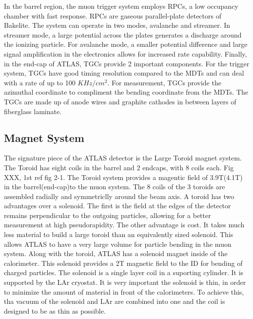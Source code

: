 \indent In the barrel region, the muon trigger system employs RPCs, a low occupancy chamber with fast response. RPCs are gaseous parallel-plate detectors of Bakelite. The system can operate in two modes, avalanche and streamer.  In streamer mode, a large potential across the plates generates a discharge around the ionizing particle. For avalanche mode, a smaller potential difference and large signal amplification in the electronics allows for increased rate capability.\linebreak
\indent Finally, in the end-cap of ATLAS, TGCs provide 2 important components. For the trigger system, TGCs have good timing resolution compared to the MDTs and can deal with a rate of up to 100 ${KHz/cm^{2}}$. For measurement, TGCs provide the azimuthal coordinate to compliment the bending coordinate from the MDTs. The TGCs are made up of anode wires and graphite cathodes in between layers of fiberglass laminate. 
\subsection{Magnet System}\label{ssec:mag}
The signature piece of the ATLAS detector is the Large Toroid magnet system. The Toroid has eight coils in the barrel and 2 endcaps, with 8 coils each. Fig XXX, 1st ref fig 2-1. The Toroid system provides a magentic field of 3.9T(4.1T) in the barrel(end-cap)to the muon system. The 8 coils of the 3 toroids are assembled radially and symmetriclly around the beam axis. A toroid has two advantages over a solenoid. The first is the field at the edges of the detector remains perpendicular to the outgoing particles, allowing for a better measurement at high pseudorapidity. The other advantage is cost. It takes much less material to build a large toroid than an equivalently sized solenoid. This allows ATLAS to have a very large volume for particle bending in the muon system.\linebreak
\indent Along with the toroid, ATLAS has a solenoid magnet inside of the calorimeter. This solenoid  provides a 2T magnetic field to the ID for bending of charged particles. The solenoid is a single layer coil in a suporting cylinder. It is supported by the LAr cryostat. It is very important the solenoid is thin, in order to minimize the amount of material in front of the calorimeters. To achieve this, tha vacuum of the solenoid and LAr are combined into one and the coil is designed to be as thin as possible.
